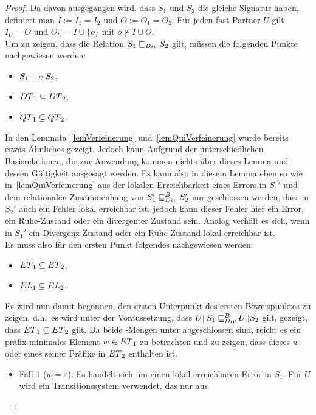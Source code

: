 \begin{proof}
  Da davon ausgegangen wird, dass $S_1$ und $S_2$ die gleiche Signatur haben,
  definiert man $I:=I_1=I_2$ und $O:=O_1=O_2$. Für jeden fast Partner $U$ gilt
  $I_U=O$ und $O_U=I\cup\{o\}$ mit $o\notin I\cup O$.\\
  Um zu zeigen, dass die Relation $S_1\sqsubseteq _{Div} S_2$ gilt, müssen die folgenden
  Punkte nachgewiesen werden:
  \begin{itemize}
    \item $S_1\sqsubseteq _E S_2$,
    \item $DT{}_1\subseteq DT{}_2$,
    \item $QT{}_1\subseteq QT{}_2$.
  \end{itemize}
  In den Lemmata~\ref{lemVerfeinerung} und~\ref{lemQuiVerfeinerung} wurde
  bereits etwas Ähnliches gezeigt. Jedoch kann Aufgrund der unterschiedlichen
  Basisrelationen, die zur Anwendung kommen nichts über dieses Lemma und dessen
  Gültigkeit ausgesagt werden. Es kann also in diesem Lemma eben so wie
  in~\ref{lemQuiVerfeinerung} aus der lokalen Erreichbarkeit eines Errors in
  $S_1'$ und dem relationalen Zusammenhang von $S_1'\sqsubseteq _{Div}^B S_2'$ nur
  geschlossen werden, dass in $S_2'$ auch ein Fehler lokal erreichbar ist,
  jedoch kann dieser Fehler hier ein Error, ein Ruhe-Zustand oder ein
  divergenter Zustand sein. Analog verhält es sich, wenn in $S_1'$ ein
  Divergenz-Zustand oder ein Ruhe-Zustand lokal erreichbar ist.\\
  Es muss also für den ersten Punkt folgendes nachgewiesen werden:
  \begin{itemize}
    \item $ET{}_1\subseteq ET{}_2$,
    \item $EL{}_1\subseteq EL{}_2$.
  \end{itemize}
  Es wird nun damit begonnen, den ersten Unterpunkt des ersten Beweispunktes zu
  zeigen, d.h.\ es wird unter der Voraussetzung, dass $U\|S_1\sqsubseteq _{Div}^B U\|S_2$
  gilt, gezeigt, dass $ET{}_1\subseteq ET{}_2$ gilt. Da beide \ET{}-Mengen
  unter \cont{} abgeschlossen sind, reicht es ein präfix-minimales Element
  $w\in ET{}_1$ zu betrachten und zu zeigen, dass dieses $w$ oder eines seiner
  Präfixe in $ET{}_2$ enthalten ist.
  \begin{itemize}
    \item Fall 1 ($w=\varepsilon$): Es handelt sich um einen lokal erreichbaren
      Error in $S_1$. Für $U$ wird ein Transitionssystem verwendet, das nur aus

\end{itemize}
\end{proof}
